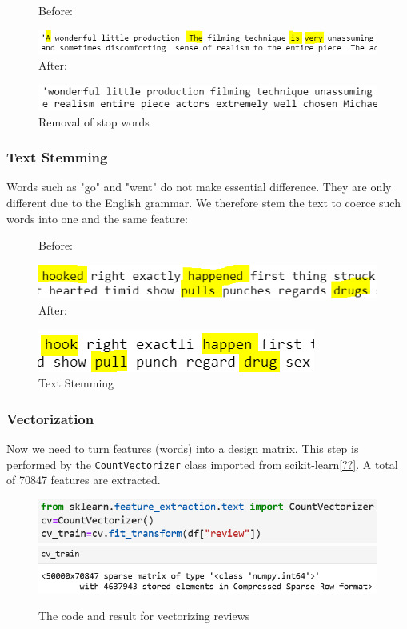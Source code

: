 \documentclass[10pt,twocolumn,letterpage]{article}
\begin{document}
	\begin{figure}[H]
		\textsf{Before:}
		
		\includegraphics[width = \columnwidth]{stop_words}
		\textsf{After:}
		
		\includegraphics[width = \columnwidth]{stop_words_removed}
		\caption{Removal of stop words}
	\end{figure}
	\subsubsection{Text Stemming}
	Words such as "go" and "went" do not make essential difference. They are only different due to the English grammar. We therefore stem the text to coerce such words into one and the same feature:
	\begin{figure}[H]
		\textsf{Before:}
		
		\includegraphics[width = \columnwidth]{stem}
		\textsf{After:}
		
		\includegraphics[width = \columnwidth]{after_stem}
		\caption{Text Stemming}
	\end{figure}
	
	\subsubsection{Vectorization}
	Now we need to turn features (words) into a design matrix. This step is performed by the \texttt{CountVectorizer} class imported from scikit-learn\ref{??}. A total of 70847 features are extracted.
	\begin{figure}[H]
		\includegraphics[width = \columnwidth]{vectorization}
		\includegraphics[width = \columnwidth]{vec_result}
		\caption{The code and result for vectorizing reviews}
	\end{figure}
	
\end{document}
